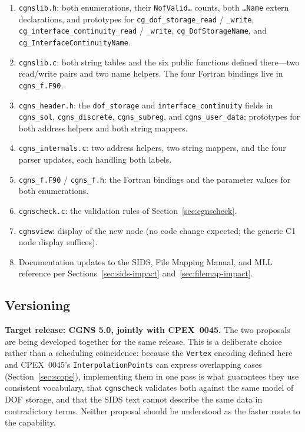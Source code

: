 \documentclass[11pt,letterpaper]{article}
\begin{document}
\begin{enumerate}[leftmargin=2em]
\item \texttt{cgnslib.h}: both enumerations, their
  \texttt{NofValid\ldots} counts, both \texttt{\ldots Name} extern
  declarations, and prototypes for
  \texttt{cg\_dof\_storage\_read} / \texttt{\_write},
  \texttt{cg\_interface\_continuity\_read} / \texttt{\_write},
  \texttt{cg\_DofStorageName}, and
  \texttt{cg\_InterfaceContinuityName}.
\item \texttt{cgnslib.c}: both string tables and the six public
  functions defined there---two read/write pairs and two name
  helpers.  The four Fortran bindings live in \texttt{cgns\_f.F90}.
\item \texttt{cgns\_header.h}: the \texttt{dof\_storage} and
  \texttt{interface\_continuity} fields in \texttt{cgns\_sol},
  \texttt{cgns\_discrete}, \texttt{cgns\_subreg}, and
  \texttt{cgns\_user\_data}; prototypes for both address helpers and
  both string mappers.
\item \texttt{cgns\_internals.c}: two address helpers, two string
  mappers, and the four parser updates, each handling both labels.
\item \texttt{cgns\_f.F90} / \texttt{cgns\_f.h}: the Fortran bindings
  and the parameter values for both enumerations.
\item \texttt{cgnscheck.c}: the validation rules of
  Section~\ref{sec:cgnscheck}.
\item \texttt{cgnsview}: display of the new node (no code change
  expected; the generic C1 node display suffices).
\item Documentation updates to the SIDS, File Mapping Manual, and MLL
  reference per Sections~\ref{sec:sids-impact}
  and~\ref{sec:filemap-impact}.
\end{enumerate}

\subsection{Versioning}

\textbf{Target release: CGNS 5.0, jointly with CPEX~0045.}  The two
proposals are being developed together for the same release.  This is a
deliberate choice rather than a scheduling coincidence: because the
\texttt{Vertex} encoding defined here and CPEX~0045's
\texttt{InterpolationPoints} can express overlapping cases
(Section~\ref{sec:scope}), implementing them in one pass is what
guarantees they use consistent vocabulary, that \texttt{cgnscheck}
validates both against the same model of DOF storage, and that the SIDS
text cannot describe the same data in contradictory terms.  Neither
proposal should be understood as the faster route to the capability.
\end{document}
